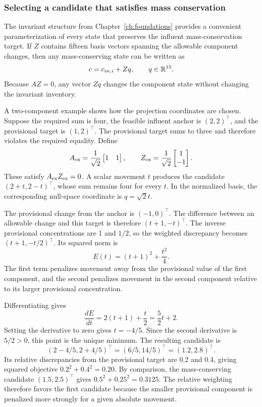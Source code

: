 \subsubsection{Selecting a candidate that satisfies mass conservation}

The invariant structure from Chapter~\ref{ch:foundations} provides a convenient parameterization of every state that preserves the influent mass-conservation target. If $Z$ contains fifteen basis vectors spanning the allowable component changes, then any mass-conserving state can be written as
\begin{equation}
\equationname{Null-space parameterization of states satisfying mass conservation}
c=c_{in,i}+Zq,\qquad q\in\mathbb{R}^{15}.
\label{eq:projection_affine_parameterization}
\end{equation}
Because $AZ=0$, any vector $Zq$ changes the component state without changing the invariant inventory.

A two-component example shows how the projection coordinates are chosen. Suppose the required sum is four, the feasible influent anchor is $(2,2)^\top$, and the provisional target is $(1,2)^\top$. The provisional target sums to three and therefore violates the required equality. Define
\[
A_{\rm ex}=\frac1{\sqrt2}\begin{bmatrix}1&1\end{bmatrix},\qquad
Z_{\rm ex}=\frac1{\sqrt2}\begin{bmatrix}1\\-1\end{bmatrix}.
\]
These satisfy $A_{\rm ex}Z_{\rm ex}=0$. A scalar movement $t$ produces the candidate
$(2+t,2-t)^\top$, whose sum remains four for every $t$. In the normalized basis, the corresponding null-space coordinate is $q=\sqrt2t$.

The provisional change from the anchor is $(-1,0)^\top$. The difference between an allowable change and this target is therefore $(t+1,-t)^\top$. The inverse provisional concentrations are 1 and $1/2$, so the weighted discrepancy becomes $(t+1,-t/2)^\top$. Its squared norm is
\[
E(t)=(t+1)^2+\frac{t^2}{4}.
\]
The first term penalizes movement away from the provisional value of the first component, and the second penalizes movement in the second component relative to its larger provisional concentration.

Differentiating gives
\[
\frac{dE}{dt}=2(t+1)+\frac t2=\frac52t+2.
\]
Setting the derivative to zero gives $t=-4/5$. Since the second derivative is $5/2>0$, this point is the unique minimum. The resulting candidate is
\[
(2-4/5,2+4/5)^\top=(6/5,14/5)^\top=(1.2,2.8)^\top.
\]
Its relative discrepancies from the provisional target are 0.2 and 0.4, giving squared objective
$0.2^2+0.4^2=0.20$.
By comparison, the mass-conserving candidate $(1.5,2.5)^\top$ gives
$0.5^2+0.25^2=0.3125$.
The relative weighting therefore favors the first candidate because the smaller provisional component is penalized more strongly for a given absolute movement.

